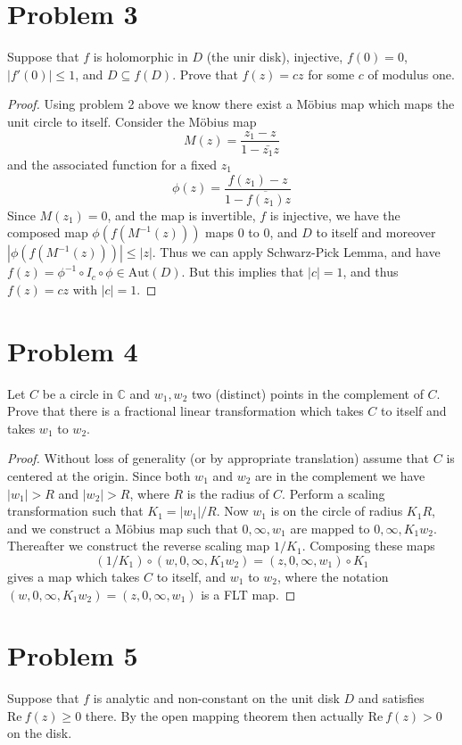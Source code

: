 \documentclass{article}[12pt]
\def\CC{{\mathbb C}}
\begin{document}
\section*{Problem 3} Suppose that $f$ is holomorphic in $D$
(the unir disk), injective, $f(0)=0$, $|f'(0)|\le 1$,
and $D\subseteq f(D)$. Prove that $f(z)=cz$ for some
$c$ of modulus one.
\begin{proof}
Using problem 2 above we know there exist a M\"obius map which
maps the unit circle to itself. Consider the M\"obius map
\[
M(z) = \frac{z_1-z}{1-\bar{z_1}z}
\]
and the associated function  for a fixed $z_1$
\[
\phi(z)=\frac{f(z_1)-z}{1-\overline{f(z_1)}z}
\]
Since $M(z_1)=0$, and the map is invertible, $f$ is injective, we have
the composed map $\phi(f(M^{-1}(z)))$ maps 0 to 0, and $D$ to itself
and moreover $|\phi(f(M^{-1}(z)))|\le |z|$.
Thus we can apply Schwarz-Pick Lemma, and have $f(z)=\phi^{-1} \circ I_c
\circ \phi \in \mbox{Aut}(D)$.
But this implies that $|c|=1$, and thus $f(z)=cz$ with $|c|=1$.
\end{proof}



\section*{Problem 4}Let $C$ be a circle in $\CC$ and
$w_1,w_2$ two (distinct) points in the complement of $C$.
Prove that there is a fractional linear transformation which takes
$C$ to itself and takes $w_1$ to $w_2$.
\begin{proof}
Without loss of generality (or by appropriate translation) assume that
$C$ is centered at the origin. Since both $w_1$ and $w_2$ are in the complement
we have $|w_1|>R$ and $|w_2|>R$, where $R$ is the radius of $C$.
Perform a scaling transformation such that $K_1=|w_1|/R$.
Now $w_1$ is on the circle of radius $K_1R$, and we construct
a M\"obius map such that $0,\infty,w_1$ are mapped to $0,\infty,K_1w_2$.
Thereafter we construct the reverse scaling map $1/K_1$.
Composing these maps 
\[
(1/K_1) \circ (w,0,\infty,K_1w_2)=(z,0,\infty,w_1) \circ K_1
\]
gives a map which takes $C$ to itself, and $w_1$ to $w_2$, where
the notation $(w,0,\infty,K_1w_2)=(z,0,\infty,w_1)$ is a FLT map.
\end{proof}

\section*{Problem 5}Suppose that $f$ is analytic and non-constant on the
unit disk $D$ and satisfies $\mbox{Re}\ f(z)\ge 0$ there.
By the open mapping theorem then actually 
$\mbox{Re}\ f(z)> 0$ on the disk.
\end{document}
